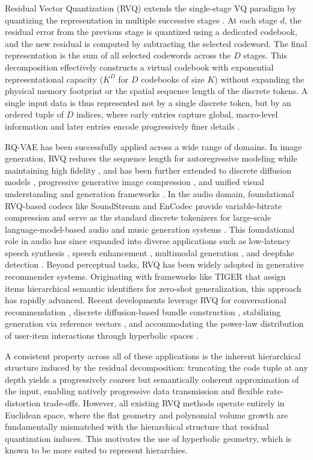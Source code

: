 \documentclass[12pt]{report}
\begin{document}
Residual Vector Quantization (RVQ) extends the single-stage VQ paradigm by quantizing the representation in multiple successive stages \cite{soundstream}. At each stage $d$, the residual error from the previous stage is quantized using a dedicated codebook, and the new residual is computed by subtracting the selected codeword. The final representation is the sum of all selected codewords across the $D$ stages. This decomposition effectively constructs a virtual codebook with exponential representational capacity ($K^D$ for $D$ codebooks of size $K$) without expanding the physical memory footprint or the spatial sequence length of the discrete tokens. A single input data is thus represented not by a single discrete token, but by an ordered tuple of $D$ indices, where early entries capture global, macro-level information and later entries encode progressively finer details \cite{lee2022rqvae}.

RQ-VAE has been successfully applied across a wide range of domains. In image generation, RVQ reduces the sequence length for autoregressive modeling while maintaining high fidelity \cite{lee2022rqvae}, and has been further extended to discrete diffusion models \cite{resgen}, progressive generative image compression \cite{progic}, and unified visual understanding and generation frameworks \cite{evotok}. In the audio domain, foundational RVQ-based codecs like SoundStream \cite{soundstream} and EnCodec \cite{encodec} provide variable-bitrate compression and serve as the standard discrete tokenizers for large-scale language-model-based audio and music generation systems \cite{audiolm, musicgen}. This foundational role in audio has since expanded into diverse applications such as low-latency speech synthesis \cite{su2026ultralow}, speech enhancement \cite{li2026llsdr}, multimodal generation \cite{ye2026hierarchical}, and deepfake detection \cite{wu2026quantizer}. Beyond perceptual tasks, RVQ has been widely adopted in generative recommender systems. Originating with frameworks like TIGER \cite{tiger} that assign items hierarchical semantic identifiers for zero-shot generalization, this approach has rapidly advanced. Recent developments leverage RVQ for conversational recommendation \cite{talkplay}, discrete diffusion-based bundle construction \cite{ddbc}, stabilizing generation via reference vectors \cite{r3vae}, and accommodating the power-law distribution of user-item interactions through hyperbolic spaces \cite{hyprqvae_recsys}.

A consistent property across all of these applications is the inherent hierarchical structure induced by the residual decomposition: truncating the code tuple at any depth yields a progressively coarser but semantically coherent approximation of the input, enabling natively progressive data transmission and flexible rate-distortion trade-offs. However, all existing RVQ methods operate entirely in Euclidean space, where the flat geometry and polynomial volume growth are fundamentally mismatched with the hierarchical structure that residual quantization induces.
This motivates the use of hyperbolic geometry, which is known to be more suited to represent hierarchies. 
\end{document}
